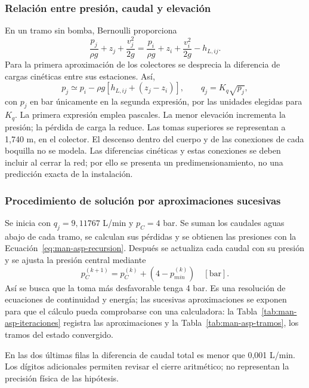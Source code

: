 \subsubsection{Relación entre presión, caudal y elevación}
En un tramo sin bomba, Bernoulli proporciona
\begin{equation}
 \frac{p_j}{\rho g}+z_j+\frac{v_j^2}{2g}
 =\frac{p_i}{\rho g}+z_i+\frac{v_i^2}{2g}-h_{L,ij}.
 \label{eq:man-asp-bernoulli-ramal}
\end{equation}
Para la primera aproximación de los colectores se desprecia la diferencia
de cargas cinéticas entre sus estaciones. Así,
\begin{equation}
 p_j\simeq p_i-\rho g\left[h_{L,ij}+(z_j-z_i)\right],\qquad
 q_j=K_q\sqrt{p_j},
 \label{eq:man-asp-recursion}
\end{equation}
con $p_j$ en bar únicamente en la segunda expresión, por las unidades
elegidas para $K_q$. La primera expresión emplea pascales.
La menor elevación incrementa la presión; la pérdida de carga la reduce.
Las tomas superiores se representan a 1,740 m, en el colector. El descenso
dentro del cuerpo y de las conexiones de cada boquilla no se modela.
Las diferencias cinéticas y estas conexiones se deben incluir al cerrar
la red; por ello se presenta un predimensionamiento, no una predicción
exacta de la instalación.

\subsubsection{Procedimiento de solución por aproximaciones sucesivas}
Se inicia con $q_j=9{,}11767$ L/min y $p_C=4$ bar. Se suman los caudales
aguas abajo de cada tramo, se calculan sus pérdidas y se obtienen las
presiones con la Ecuación~\eqref{eq:man-asp-recursion}. Después se actualiza
cada caudal con su presión y se ajusta la presión central mediante
\begin{equation}
 p_C^{(k+1)}=p_C^{(k)}+\left(4-p_{min}^{(k)}\right)
 \quad[\mathrm{bar}].
 \label{eq:man-asp-iteracion}
\end{equation}
Así se busca que la toma más desfavorable tenga 4 bar. Es una resolución
de ecuaciones de continuidad y energía; las sucesivas aproximaciones se
exponen para que el cálculo pueda comprobarse con una calculadora: la
Tabla~\ref{tab:man-asp-iteraciones} registra las aproximaciones y la
Tabla~\ref{tab:man-asp-tramos}, los tramos del estado convergido.

\begin{table}[htbp]
\centering\small
\caption{Aproximaciones sucesivas para determinar la presión central.}
\label{tab:man-asp-iteraciones}

\end{table}
En las dos últimas filas la diferencia de caudal total es menor que
0,001 L/min. Los dígitos adicionales permiten revisar el cierre aritmético;
no representan la precisión física de las hipótesis.

